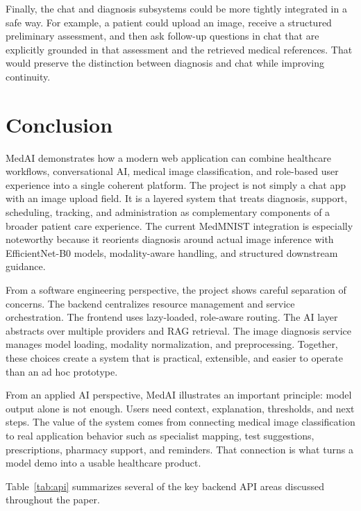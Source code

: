 \documentclass[conference]{IEEEtran}
\begin{document}
Finally, the chat and diagnosis subsystems could be more tightly integrated in a safe way. For example, a patient could upload an image, receive a structured preliminary assessment, and then ask follow-up questions in chat that are explicitly grounded in that assessment and the retrieved medical references. That would preserve the distinction between diagnosis and chat while improving continuity.

\section{Conclusion}
MedAI demonstrates how a modern web application can combine healthcare workflows, conversational AI, medical image classification, and role-based user experience into a single coherent platform. The project is not simply a chat app with an image upload field. It is a layered system that treats diagnosis, support, scheduling, tracking, and administration as complementary components of a broader patient care experience. The current MedMNIST integration is especially noteworthy because it reorients diagnosis around actual image inference with EfficientNet-B0 models, modality-aware handling, and structured downstream guidance.

From a software engineering perspective, the project shows careful separation of concerns. The backend centralizes resource management and service orchestration. The frontend uses lazy-loaded, role-aware routing. The AI layer abstracts over multiple providers and RAG retrieval. The image diagnosis service manages model loading, modality normalization, and preprocessing. Together, these choices create a system that is practical, extensible, and easier to operate than an ad hoc prototype.

From an applied AI perspective, MedAI illustrates an important principle: model output alone is not enough. Users need context, explanation, thresholds, and next steps. The value of the system comes from connecting medical image classification to real application behavior such as specialist mapping, test suggestions, prescriptions, pharmacy support, and reminders. That connection is what turns a model demo into a usable healthcare product.

Table~\ref{tab:api} summarizes several of the key backend API areas discussed throughout the paper.
\end{document}
